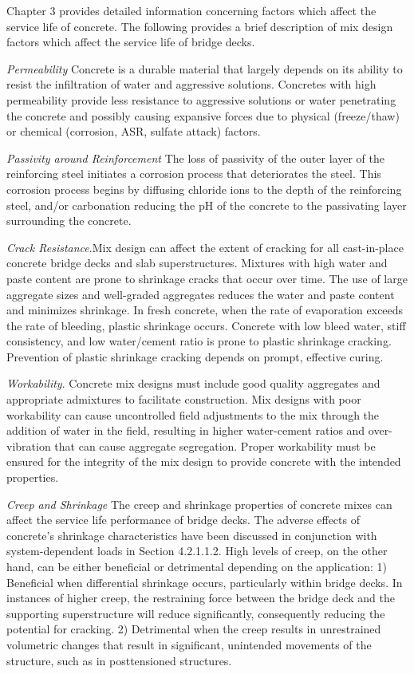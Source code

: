 Chapter 3 provides detailed information concerning factors which affect the service life of concrete. The
following provides a brief description of mix design factors which affect the service life of bridge decks.

\emph{Permeability} Concrete is a durable material that largely depends on its ability to resist the infiltration of water and
aggressive solutions. Concretes with high permeability provide less resistance to aggressive solutions or water
penetrating the concrete and possibly causing expansive forces due to physical (freeze/thaw) or chemical (corrosion,
ASR, sulfate attack) factors.

\emph{Passivity around Reinforcement} The loss of passivity of the outer layer of the reinforcing steel initiates a corrosion
process that deteriorates the steel. This corrosion process begins by diffusing chloride ions to the depth of the
reinforcing steel, and/or carbonation reducing the pH of the concrete to the passivating layer surrounding the
concrete.

\emph{Crack Resistance}.Mix design can affect the extent of cracking for all cast-in-place concrete bridge decks and slab
superstructures. Mixtures with high water and paste content are prone to shrinkage cracks that occur over time. The
use of large aggregate sizes and well-graded aggregates reduces the water and paste content and minimizes
shrinkage. In fresh concrete, when the rate of evaporation exceeds the rate of bleeding, plastic shrinkage occurs. Concrete with low bleed water, stiff consistency, and low water/cement ratio is prone to plastic shrinkage cracking.
Prevention of plastic shrinkage cracking depends on prompt, effective curing.

\emph{Workability}. Concrete mix designs must include good quality aggregates and appropriate admixtures to facilitate
construction. Mix designs with poor workability can cause uncontrolled field adjustments to the mix through the
addition of water in the field, resulting in higher water-cement ratios and over-vibration that can cause aggregate
segregation. Proper workability must be ensured for the integrity of the mix design to provide concrete with the
intended properties.

\emph{Creep and Shrinkage} The creep and shrinkage properties of concrete mixes can affect the service life performance
of bridge decks. The adverse effects of concrete’s shrinkage characteristics have been discussed in conjunction with
system-dependent loads in Section 4.2.1.1.2. High levels of creep, on the other hand, can be either beneficial or
detrimental depending on the application: 1) Beneficial when differential shrinkage occurs, particularly within bridge
decks. In instances of higher creep, the restraining force between the bridge deck and the supporting superstructure
will reduce significantly, consequently reducing the potential for cracking. 2) Detrimental when the creep results in
unrestrained volumetric changes that result in significant, unintended movements of the structure, such as in
posttensioned structures.


